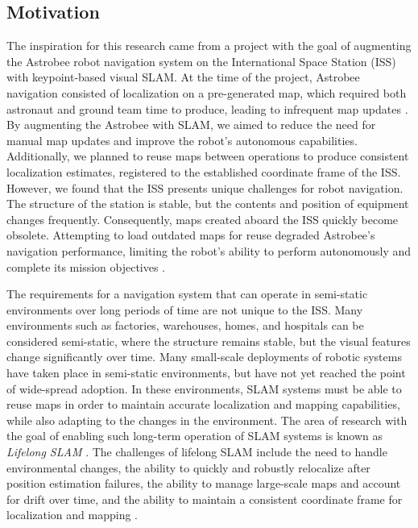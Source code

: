 \subsection{Motivation}


The inspiration for this research came from a project with the goal of augmenting the Astrobee robot navigation system on the International Space Station (ISS) with keypoint-based visual SLAM. At the time of the project, Astrobee navigation consisted of localization on a pre-generated map, which required both astronaut and ground team time to produce, leading to infrequent map updates \cite{soussanAstroLocEfficientRobust2022}. By augmenting the Astrobee with SLAM, we aimed to reduce the need for manual map updates and improve the robot's autonomous capabilities. Additionally, we planned to reuse maps between operations to produce consistent localization estimates, registered to the established coordinate frame of the ISS. However, we found that the ISS presents unique challenges for robot navigation. The structure of the station is stable, but the contents and position of equipment changes frequently. Consequently, maps created aboard the ISS quickly become obsolete. Attempting to load outdated maps for reuse degraded Astrobee's navigation performance, limiting the robot's ability to perform autonomously and complete its mission objectives \cite{zuralesCollaborativeSensingMapping2024}.


The requirements for a navigation system that can operate in semi-static environments over long periods of time are not unique to the ISS. Many environments such as factories, warehouses, homes, and hospitals can be considered semi-static, where the structure remains stable, but the visual features change significantly over time. Many small-scale deployments of robotic systems have taken place in semi-static environments, but have not yet reached the point of wide-spread adoption. In these environments, SLAM systems must be able to reuse maps in order to maintain accurate localization and mapping capabilities, while also adapting to the changes in the environment. The area of research with the goal of enabling such long-term operation of SLAM systems is known as \textit{Lifelong SLAM} \cite{bujancaRobustSLAMSystems2021}. The challenges of lifelong SLAM include the need to handle environmental changes, the ability to quickly and robustly relocalize after position estimation failures, the ability to manage large-scale maps and account for drift over time, and the ability to maintain a consistent coordinate frame for localization and mapping \cite{saputraVisualSLAMStructure2019}.


